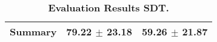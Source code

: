 \begin{table}[htb]
{\begin{tabular}{lll}
\midrule
\textbf{Summary                                  } &                  \phantom{0}79.22 $\pm$ 23.18 &                       \phantom{0}59.26 $\pm$ 21.87 \\
\bottomrule
\end{tabular}%
}
\caption{\textbf{Evaluation Results SDT.}}
\label{tab:eval-results}
\end{table}
